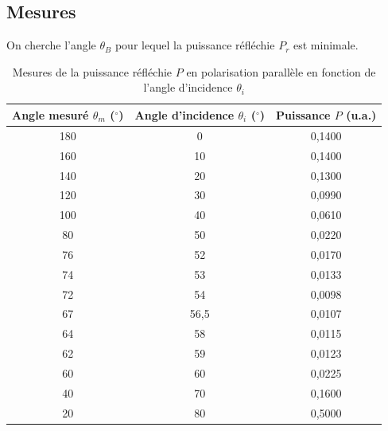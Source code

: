 \documentclass[a4paper,9pt,french]{scrartcl}
\begin{document}
\subsection{Mesures}
On cherche l'angle $\theta_B$ pour lequel la puissance réfléchie $P_r$ est minimale.
\begin{table}[H]
\centering
\begin{tabular}{|c|c|c|}
\hline
\textbf{Angle mesuré $\theta_m$ ($^\circ$)} & \textbf{Angle d'incidence $\theta_i$ ($^\circ$)} & \textbf{Puissance $P$ (u.a.)} \\ \hline
180 & 0    & 0,1400 \\ \hline
160 & 10   & 0,1400 \\ \hline
140 & 20   & 0,1300 \\ \hline
120 & 30   & 0,0990 \\ \hline
100 & 40   & 0,0610 \\ \hline
80  & 50   & 0,0220 \\ \hline
76  & 52   & 0,0170 \\ \hline
74  & 53   & 0,0133 \\ \hline
72  & 54   & 0,0098 \\ \hline
67  & 56,5 & 0,0107 \\ \hline
64  & 58   & 0,0115 \\ \hline
62  & 59   & 0,0123 \\ \hline
60  & 60   & 0,0225 \\ \hline
40  & 70   & 0,1600 \\ \hline
20  & 80   & 0,5000 \\ \hline
\end{tabular}
\caption{Mesures de la puissance réfléchie $P$ en polarisation parallèle en fonction de l'angle d'incidence $\theta_i$}
\label{tab:brewster_data}
\end{table}
\end{document}
